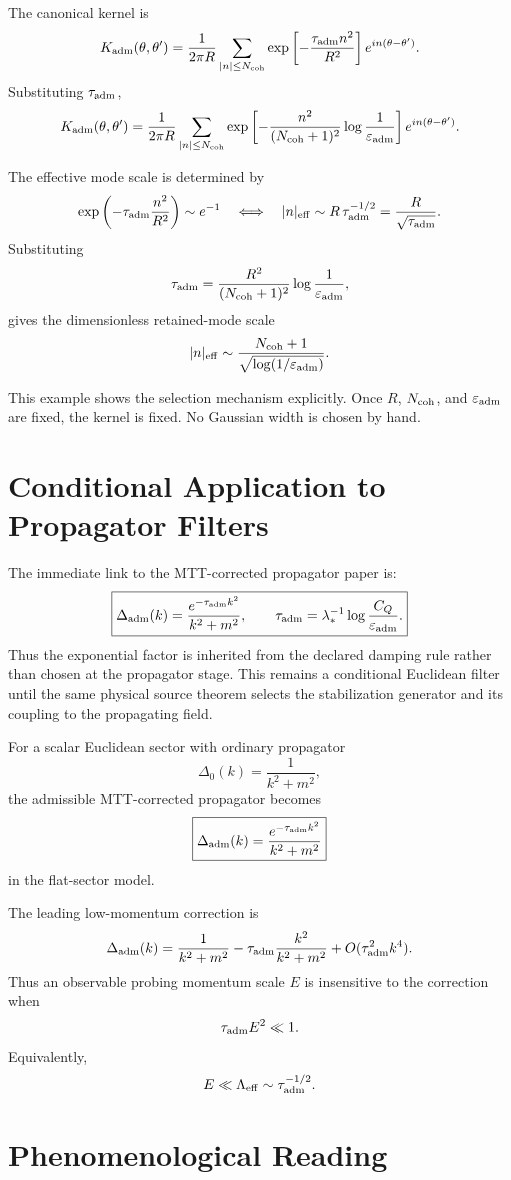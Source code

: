 \documentclass[11pt]{article}
\begin{document}
The canonical kernel is
\[
K_{\rm adm}(\theta,\theta')
=
\frac{1}{2\pi R}
\sum_{|n|\le N_{\rm coh}}
\exp\left[
-\frac{\tau_{\rm adm}n^2}{R^2}
\right]
e^{in(\theta-\theta')}.
\]
Substituting \(\tau_{\rm adm}\),
\[
K_{\rm adm}(\theta,\theta')
=
\frac{1}{2\pi R}
\sum_{|n|\le N_{\rm coh}}
\exp\left[
-\frac{n^2}{(N_{\rm coh}+1)^2}
\log\frac{1}{\varepsilon_{\rm adm}}
\right]
e^{in(\theta-\theta')}.
\]

The effective mode scale is determined by
\[
\exp\left(-\tau_{\rm adm}\frac{n^2}{R^2}\right)\sim e^{-1}
\quad\Longleftrightarrow\quad
|n|_{\rm eff}\sim R\,\tau_{\rm adm}^{-1/2}
=\frac{R}{\sqrt{\tau_{\rm adm}}}.
\]
Substituting
\[
\tau_{\rm adm}=\frac{R^2}{(N_{\rm coh}+1)^2}\log\frac{1}{\varepsilon_{\rm adm}},
\]
gives the dimensionless retained-mode scale
\[
|n|_{\rm eff}
\sim
\frac{N_{\rm coh}+1}{\sqrt{\log(1/\varepsilon_{\rm adm})}}.
\]

This example shows the selection mechanism explicitly. Once \(R\), \(N_{\rm coh}\), and \(\varepsilon_{\rm adm}\) are fixed, the kernel is fixed. No Gaussian width is chosen by hand.

\section{Conditional Application to Propagator Filters}

The immediate link to the MTT-corrected propagator paper is:
\[
\boxed{
\Delta_{\rm adm}(k)
=
\frac{e^{-\tau_{\rm adm}k^2}}{k^2+m^2},
\qquad
\tau_{\rm adm}
=
\lambda_\ast^{-1}\log\frac{C_Q}{\varepsilon_{\rm adm}}.
}
\]
Thus the exponential factor is inherited from the declared damping rule rather than chosen at
the propagator stage. This remains a conditional Euclidean filter until the same physical
source theorem selects the stabilization generator and its coupling to the propagating field.

For a scalar Euclidean sector with ordinary propagator
\[
\Delta_0(k)=\frac{1}{k^2+m^2},
\]
the admissible MTT-corrected propagator becomes
\[
\boxed{
\Delta_{\rm adm}(k)
=
\frac{e^{-\tau_{\rm adm}k^2}}{k^2+m^2}
}
\]
in the flat-sector model.

The leading low-momentum correction is
\[
\Delta_{\rm adm}(k)
=
\frac{1}{k^2+m^2}
-
\tau_{\rm adm}\frac{k^2}{k^2+m^2}
+
O(\tau_{\rm adm}^2k^4).
\]
Thus an observable probing momentum scale \(E\) is insensitive to the correction when
\[
\tau_{\rm adm}E^2\ll1.
\]
Equivalently,
\[
E\ll \Lambda_{\rm eff}\sim\tau_{\rm adm}^{-1/2}.
\]

\section{Phenomenological Reading}
\end{document}
